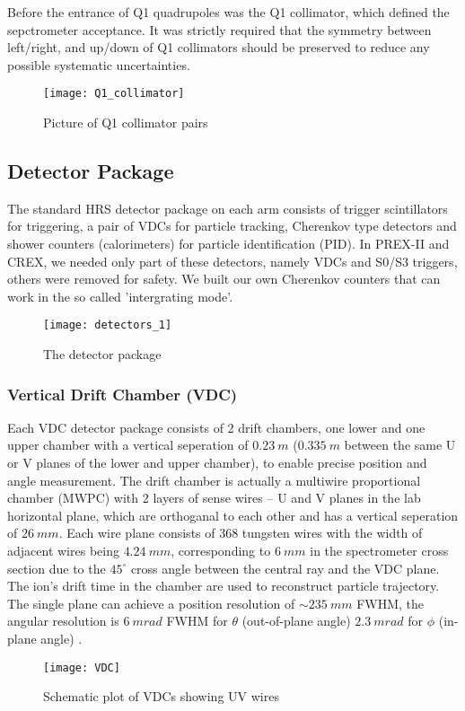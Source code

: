 Before the entrance of Q1 quadrupoles was the Q1 collimator, which defined
the sepctrometer acceptance. It was strictly required that the symmetry between
left/right, and up/down of Q1 collimators should be preserved to reduce any
possible systematic uncertainties.
\begin{figure}[h!]
    \centering
    \texttt{[image: Q1\_collimator]}
    \caption{Picture of Q1 collimator pairs}
\end{figure}
\subsection{Detector Package}
The standard HRS detector package on each arm consists of trigger scintillators for
triggering, a pair of VDCs for particle tracking, Cherenkov type detectors and
shower counters (calorimeters) for particle identification (PID). In PREX-II
and CREX, we needed only part of these detectors, namely VDCs and S0/S3 triggers,
others were removed for safety. We built our own Cherenkov counters that can 
work in the so called 'intergrating mode'.
\begin{figure}[h!]
    \centering
    \texttt{[image: detectors\_1]}
    \caption{The detector package}
    \label{fig:detectors}
\end{figure}

\subsubsection{Vertical Drift Chamber (VDC)}
Each VDC detector package consists of 2 drift chambers, one lower and one upper
chamber with a vertical seperation of $0.23\ m$ ($0.335\ m$ between the same
U or V planes of the lower and upper chamber), to enable precise position and angle measurement. 
The drift chamber is actually a multiwire proportional chamber (MWPC) with 2 
layers of sense wires -- U and V planes in the lab horizontal plane, which are 
orthoganal to each other and has a vertical seperation of $26\ mm$. 
Each wire plane consists of 368 tungsten wires with the width of adjacent wires 
being $4.24\ mm$, corresponding to $6\ mm$ in the spectrometer cross section due to the $45^\circ$
cross angle between the central ray and the VDC plane. The ion's drift time in 
the chamber are used to reconstruct particle trajectory. The single plane can
achieve a position resolution of $\sim 235\ mm$ FWHM, the angular resolution
is $6\ mrad$ FWHM for $\theta$ (out-of-plane angle) $2.3\ mrad$ for $\phi$ (in-plane
angle) \cite{FISSUM2001108}.
\begin{figure}[h!]
    \centering
    \texttt{[image: VDC]}
    \caption{Schematic plot of VDCs showing UV wires \cite{FISSUM2001108}}
\end{figure}

